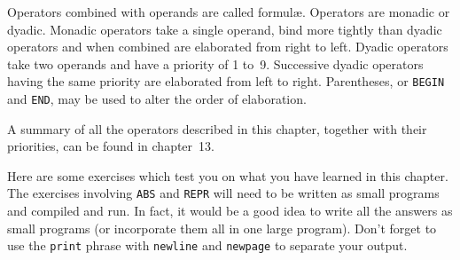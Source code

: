 Operators combined with operands are called formul{\ae}. Operators are
monadic or dyadic. Monadic operators take a single operand, bind more
tightly than dyadic operators and when combined are elaborated from
right to left. Dyadic operators take two operands and have a priority
of 1 to~9. Successive dyadic operators having the same priority are
elaborated from left to right. Parentheses, or \verb|BEGIN| and
\verb|END|, may be used to alter the order of elaboration.

A summary of all the operators described in this chapter, together
with their priorities, can be found in chapter~13.

Here are some exercises which test you on what you have learned in
this chapter.  The exercises involving \verb|ABS| and \verb|REPR|
will need to be written as small programs and compiled and run.  In
fact, it would be a good idea to write all the answers as small
programs (or incorporate them all in one large program).  Don't
forget to use the \verb|print| phrase with \verb|newline| and
\verb|newpage| to separate your output.

